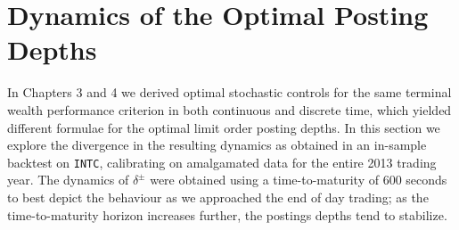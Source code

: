 \section{Dynamics of the Optimal Posting Depths}

In Chapters 3 and 4 we derived optimal stochastic controls for the same terminal wealth performance criterion in both continuous and discrete time, which yielded different formulae for the optimal limit order posting depths. In this section we explore the divergence in the resulting dynamics as obtained in an in-sample backtest on \texttt{INTC}, calibrating on amalgamated data for the entire 2013 trading year. The dynamics of $\delta^\pm$ were obtained using a time-to-maturity of 600 seconds to best depict the behaviour as we approached the end of day trading; as the time-to-maturity horizon increases further, the postings depths tend to stabilize. 

